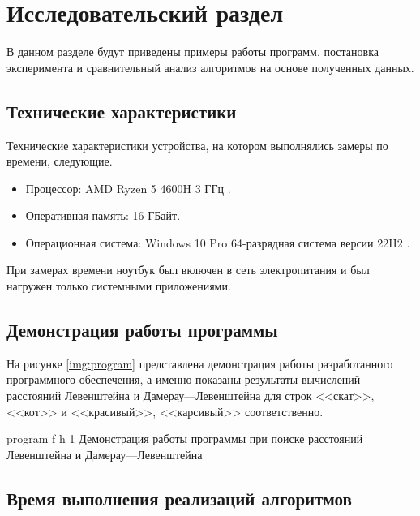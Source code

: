 \chapter{Исследовательский раздел}

В данном разделе будут приведены примеры работы программ, постановка эксперимента и сравнительный анализ алгоритмов на основе полученных данных.


\section{Технические характеристики}

Технические характеристики устройства, на котором выполнялись замеры по времени, следующие.

\begin{itemize}
	\item Процессор: AMD Ryzen 5 4600H 3 ГГц \cite{amd}.
	\item Оперативная память: 16 ГБайт.
	\item Операционная система: Windows 10 Pro 64-разрядная система версии 22H2 \cite{windows}.
\end{itemize}

При замерах времени ноутбук был включен в сеть электропитания и был нагружен только системными приложениями.


\section{Демонстрация работы программы}

На рисунке \ref{img:program} представлена демонстрация работы разработанного программного обеспечения, а именно показаны результаты вычислений расстояний Левенштейна и Дамерау---Левенштейна для строк <<скат>>, <<кот>> и <<красивый>>, <<карсивый>> соответственно.  
\clearpage

{program} %
{f} %
{h} %
{1\textwidth} %
{Демонстрация работы программы при поиске расстояний Левенштейна и Дамерау---Левенштейна} %

\clearpage

\section{Время выполнения реализаций алгоритмов}

